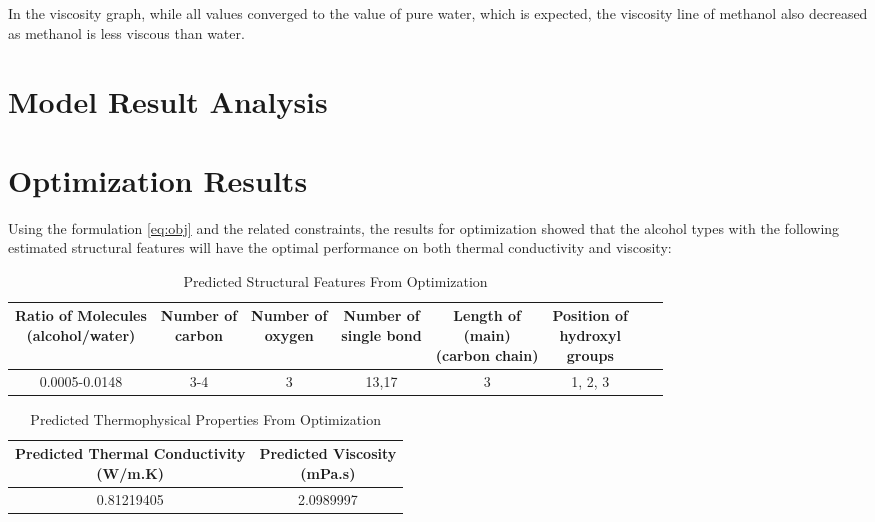 In the viscosity graph, while all values converged to the value of pure water, 
which is expected, the viscosity line of methanol also decreased as methanol 
is less viscous than water.
\section{Model Result Analysis}

\section{Optimization Results}
Using the formulation \ref{eq:obj} and the related constraints, the results for 
optimization showed that the alcohol types with the following estimated 
structural features will have the optimal performance on both thermal 
conductivity and viscosity:
\begin{table}[ht]
    \centering
    \caption{Predicted Structural Features From Optimization}
    \begin{tabular}{|c|c|c|c|c|c|c|c|}
        \hline
        \hline
        \thead{Ratio of Molecules \\ (alcohol/water)} & \thead{Number of \\carbon} & \thead{Number of \\oxygen}
        & \thead{Number of \\single bond} & \thead{Length of \\(main) \\ (carbon chain)} & \thead{Position of \\hydroxyl \\groups}\\
        \hline
        0.0005-0.0148  & 3-4 & 3 & 13,17 & 3 & 1, 2, 3\\
        \hline
    \end{tabular}
    \label{table:opt}
\end{table}
\begin{table}[ht]
    \centering
    \caption{Predicted Thermophysical Properties From Optimization}
    \begin{tabular}{|c|c|}
        \hline
        \hline
        \thead{Predicted Thermal Conductivity\\ (W/m.K)}& \thead{Predicted Viscosity \\(mPa.s)}\\
        \hline
         0.81219405 & 2.0989997\\
        \hline
    \end{tabular}
    \label{table:prop}
\end{table}


